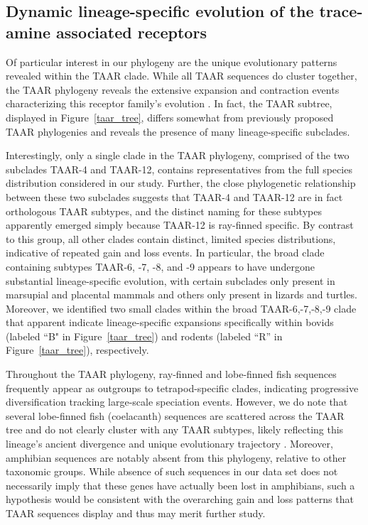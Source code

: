 \documentclass[fleqn,10pt]{wlpeerj}
\begin{document}
\subsection*{Dynamic lineage-specific evolution of the trace-amine associated receptors}
Of particular interest in our phylogeny are the unique evolutionary patterns revealed within the TAAR clade. While all TAAR sequences do cluster together, the TAAR phylogeny reveals the extensive expansion and contraction events characterizing this receptor family's evolution \citep{Lindemann2005,Hashiguchi2007,Staubert2010,Staubert2013}. In fact, the TAAR subtree, displayed in Figure~\ref{taar_tree}, differs somewhat from previously proposed TAAR phylogenies \citep{Lindemann2005, Hashiguchi2007} and reveals the presence of many lineage-specific subclades.

Interestingly, only a single clade in the TAAR phylogeny, comprised of the two subclades TAAR-4 and TAAR-12, contains representatives from the full species distribution considered in our study. Further, the close phylogenetic relationship between these two subclades suggests that TAAR-4 and TAAR-12 are in fact orthologous TAAR subtypes, and the distinct naming for these subtypes apparently emerged simply because TAAR-12 is ray-finned specific. By contrast to this group, all other clades contain distinct, limited species distributions, indicative of repeated gain and loss events. In particular, the broad clade containing subtypes TAAR-6, -7, -8, and -9 appears to have undergone substantial lineage-specific evolution, with certain subclades only present in marsupial and placental mammals and others only present in lizards and turtles. Moreover, we identified two small clades within the broad TAAR-6,-7,-8,-9 clade that apparent indicate lineage-specific expansions specifically within bovids (labeled ``B" in Figure~\ref{taar_tree}) and rodents (labeled ``R'' in Figure~\ref{taar_tree}), respectively.

Throughout the TAAR phylogeny, ray-finned and lobe-finned fish sequences frequently appear as outgroups to tetrapod-specific clades, indicating progressive diversification tracking large-scale speciation events. However, we do note that several lobe-finned fish (coelacanth) sequences are scattered across the TAAR tree and do not clearly cluster with any TAAR subtypes, likely reflecting this lineage's ancient divergence and unique evolutionary trajectory \citep{coelacanth2013}. Moreover, amphibian sequences are notably absent from this phylogeny, relative to other taxonomic groups. While absence of such sequences in our data set does not necessarily imply that these genes have actually been lost in amphibians, such a hypothesis would be consistent with the overarching gain and loss patterns that TAAR sequences display and thus may merit further study.
\end{document}
